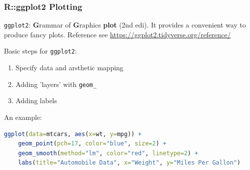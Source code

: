 \subsubsection{R::ggplot2 Plotting}
    \lstinline|ggplot2|: \textbf{G}rammar of \textbf{G}raphics \textbf{plot} (2nd edi). It provides a convenient way to produce fancy plots. Reference see \url{https://ggplot2.tidyverse.org/reference/}
    
    Basic steps for \lstinline|ggplot2|:
    \begin{enumerate}[topsep=2pt,itemsep=2pt]
        \item Specify data and arsthetic mapping
        \item Adding 'layers' with \lstinline|geom_|
        \item Adding labels
    \end{enumerate}

    An example:
\begin{lstlisting}[language=R]
ggplot(data=mtcars, aes(x=wt, y=mpg)) +
    geom_point(pch=17, color="blue", size=2) +
    geom_smooth(method="lm", color="red", linetype=2) +
    labs(title="Automobile Data", x="Weight", y="Miles Per Gallon")
\end{lstlisting}


